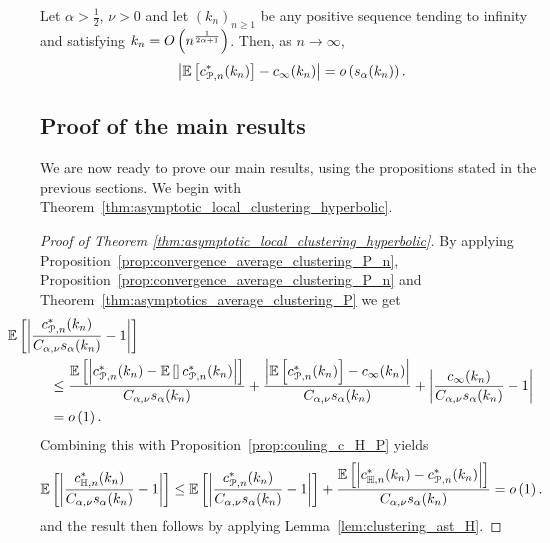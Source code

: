 \begin{proposition}\label{prop:convergence_average_clustering_P_n}
Let $\alpha > \frac{1}{2}$, $\nu > 0$ and let $(k_n)_{n \ge 1}$ be any positive sequence tending to infinity and satisfying $k_n = O\left(n^{\frac{1}{2\alpha+1}}\right)$. Then, as $n \to \infty$,
\[
	\left|\mathbb{E}\left[c_{{\mathcal P},n}^\ast(k_n)\right] - c_\infty(k_n)\right| = o\left(s_\alpha(k_n)\right).
\]
\end{proposition}


\subsection{Proof of the main results}\label{ssec:proof_main_results}

We are now ready to prove our main results, using the propositions stated in the previous sections. We begin with Theorem~\ref{thm:asymptotic_local_clustering_hyperbolic}.

\begin{proof}[Proof of Theorem \ref{thm:asymptotic_local_clustering_hyperbolic}]
By applying Proposition~\ref{prop:convergence_average_clustering_P_n}, Proposition~\ref{prop:convergence_average_clustering_P_n} and Theorem~\ref{thm:asymptotics_average_clustering_P} we get
\begin{align*}
	&\hspace{-30pt}\Exp{\left|\frac{c_{\Pcal,n}^\ast(k_n)}{C_{\alpha,\nu}s_\alpha(k_n)} - 1\right|}\\
	&\le \frac{\Exp{\left|c_{\Pcal,n}^\ast(k_n) - \Exp{}c_{\Pcal,n}^\ast(k_n)\right|}}{C_{\alpha,\nu}s_\alpha(k_n)}
		+ \frac{\left|\Exp{c_{\Pcal,n}^\ast(k_n)} - c_\infty(k_n)\right|}{C_{\alpha,\nu}s_\alpha(k_n)}
		+ \left|\frac{c_{\infty}(k_n)}{C_{\alpha,\nu}s_\alpha(k_n)} - 1\right| \\
	&= \smallO{1}.
\end{align*}
Combining this with Proposition~\ref{prop:couling_c_H_P} yields
\[
	\mathbb{E}\left[\left|\frac{c_{\mathbb{H},n}^\ast(k_n)}{C_{\alpha,\nu}s_\alpha(k_n)} - 1\right|\right]
	\le \mathbb{E}\left[\left|\frac{c_{{\mathcal P},n}^\ast(k_n)}{C_{\alpha,\nu}s_\alpha(k_n)} - 1\right|\right] 
	+ \frac{\mathbb{E}\left[\left|c_{\mathbb{H},n}^\ast(k_n) - c_{{\mathcal P},n}^\ast(k_n)\right|\right]}{C_{\alpha,\nu}s_\alpha(k_n)} = o\left(1\right).
\]
and the result then follows by applying Lemma~\ref{lem:clustering_ast_H}. 
\end{proof}

